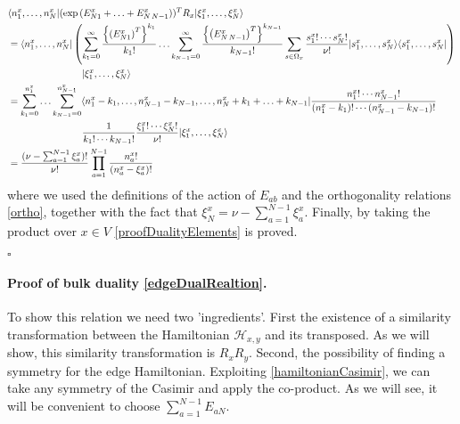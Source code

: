\documentclass[10pt]{article}
\numberwithin{equation}{section}
\numberwithin{equation}{subsection}
\begin{document}
\begin{align*}
&\langle n_{1}^{x},\ldots,n_{N}^{x}|(\exp{(E_{N1}^{x}+\ldots+E_{N\,N-1}^{x})})^{T}R_{x}|\xi_{1}^{x},\ldots,\xi_{N}^{x}\rangle\\&= \langle  n_{1}^{x},\ldots,n_{N}^{x}|\left(\sum_{k_{1}=0}^{\infty}\frac{\left\{\left(E_{N1}^{x}\right)^{T}\right\}^{k_{1}}}{k_{1}!}\ldots\sum_{k_{N-1}=0}^{\infty}\frac{\left\{\left(E_{N\,N-1}^{x}\right)^{T}\right\}^{k_{N-1}}}{k_{N-1}!}\sum_{s\in\Omega_{x}}\frac{s_{1}^{x}!\cdots s_{N}^{x}!}{\nu!}|s_{1}^{x},\ldots,s_{N}^{x}\rangle\langle s_{1}^{x},\ldots,s_{N}^{x}|\right)
\\&
\hspace{2.cm}\qquad|\xi_{1}^{x},\ldots,\xi_{N}^{x}\rangle
\\&=
\sum_{k_{1}=0}^{n_{1}^{x}}\ldots\sum_{k_{N-1}=0}^{n_{N-1}^{x}}\langle n_{1}^{x}-k_{1},\ldots,n_{N-1}^{x}-k_{N-1},\ldots,n_{N}^{x}+k_{1}+\ldots+k_{N-1}|\frac{n_{1}^{x}!\cdots n_{N-1}^{x}!}{(n_{1}^{x}-k_{1})!\cdots(n_{N-1}^{x}-k_{N-1})!}
\\& 
\hspace{2.cm}\qquad\frac{1}{k_{1}!\cdots k_{N-1}!}\frac{\xi_{1}^{x}!\cdots \xi_{N}^{x}!}{\nu!}|\xi_{1}^{x},\ldots,\xi_{N}^{x}\rangle
\\&=
\frac{(\nu-\sum_{a=1}^{N-1}\xi_{a}^{x})!}{\nu!}\prod_{a=1}^{N-1}\frac{n_{a}^{x}!}{(n_{a}^{x}-\xi_{a}^{x})!}
\end{align*}
where we used the definitions of the action of $E_{ab}$  and the orthogonality relations \eqref{ortho}, together with the fact that $\xi_{N}^{x}=\nu-\sum_{a=1}^{N-1}\xi_{a}^{x}$. 
Finally, by taking the product over $x\in V$ \eqref{proofDualityElements} is proved.
\begin{flushright}
    $\square$
\end{flushright}


\paragraph{Proof of bulk duality \eqref{edgeDualRealtion}.}To show this relation we need two 'ingredients'. First the existence of a similarity transformation between the Hamiltonian $\mathcal{H}_{x,y}$  and its transposed. As we will show, this similarity transformation is $R_{x}R_{y}$.  Second, the possibility of finding a symmetry for the edge Hamiltonian. Exploiting \eqref{hamiltonianCasimir}, we can take any symmetry of the Casimir and apply the co-product. As we will see, it will be convenient to choose $\sum_{a=1}^{N-1}E_{aN}$. 
\end{document}
